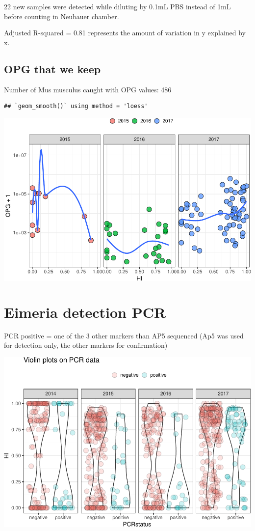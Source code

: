\documentclass[]{article}
\begin{document}
22 new samples were detected while diluting by 0.1mL PBS instead of 1mL
before counting in Neubauer chamber.

Adjusted R-squared = 0.81 represents the amount of variation in y
explained by x.

\subsection{OPG that we keep}\label{opg-that-we-keep-1}

Number of Mus musculus caught with OPG values: 486

\begin{verbatim}
## `geom_smooth()` using method = 'loess'
\end{verbatim}

\includegraphics{Data_Analysis_Alice_files/figure-latex/oocystssmooth_3.75-1.pdf}

\section{Eimeria detection PCR}\label{eimeria-detection-pcr-1}

PCR positive = one of the 3 other markers than AP5 sequenced (Ap5 was
used for detection only, the other markers for confirmation)

\includegraphics{Data_Analysis_Alice_files/figure-latex/pcr_3.75-1.pdf}
\end{document}
